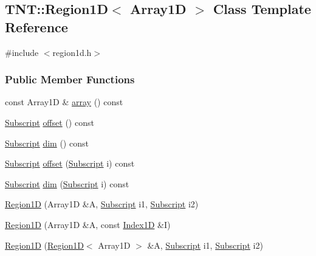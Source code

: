 \subsection{TNT::Region1D$<$ Array1D $>$ Class Template Reference}
\label{class_t_n_t_1_1_region1_d}


{\ttfamily \#include $<$region1d.h$>$}

\subsubsection*{Public Member Functions}
\begin{DoxyCompactItemize}
\item 
const Array1D \& \hyperlink{class_t_n_t_1_1_region1_d_a4a48f0b5e6afe11203954dfddfbfb043}{array} () const 
\item 
\hyperlink{namespace_t_n_t_af22e3f1460e145c04ce4e7d701e4c1c1}{Subscript} \hyperlink{class_t_n_t_1_1_region1_d_a4ed88c61c8a1896f2ce9f5c2bd526a80}{offset} () const 
\item 
\hyperlink{namespace_t_n_t_af22e3f1460e145c04ce4e7d701e4c1c1}{Subscript} \hyperlink{class_t_n_t_1_1_region1_d_ae6f7b2d153d4ea052350758477582fb4}{dim} () const 
\item 
\hyperlink{namespace_t_n_t_af22e3f1460e145c04ce4e7d701e4c1c1}{Subscript} \hyperlink{class_t_n_t_1_1_region1_d_aefc7cb51f8f4aea42c0c98bd4b52e626}{offset} (\hyperlink{namespace_t_n_t_af22e3f1460e145c04ce4e7d701e4c1c1}{Subscript} i) const 
\item 
\hyperlink{namespace_t_n_t_af22e3f1460e145c04ce4e7d701e4c1c1}{Subscript} \hyperlink{class_t_n_t_1_1_region1_d_a90770f8694db913e18cce320deb44133}{dim} (\hyperlink{namespace_t_n_t_af22e3f1460e145c04ce4e7d701e4c1c1}{Subscript} i) const 
\item 
\hyperlink{class_t_n_t_1_1_region1_d_aba435321e2decb4525752a3099ffd0f6}{Region1D} (Array1D \&A, \hyperlink{namespace_t_n_t_af22e3f1460e145c04ce4e7d701e4c1c1}{Subscript} i1, \hyperlink{namespace_t_n_t_af22e3f1460e145c04ce4e7d701e4c1c1}{Subscript} i2)
\item 
\hyperlink{class_t_n_t_1_1_region1_d_a912cdea70f01341659c674642d8893e2}{Region1D} (Array1D \&A, const \hyperlink{class_t_n_t_1_1_index1_d}{Index1D} \&I)
\item 
\hyperlink{class_t_n_t_1_1_region1_d_ac233b6dad14b1ab541ffd02d05e7a554}{Region1D} (\hyperlink{class_t_n_t_1_1_region1_d}{Region1D}$<$ Array1D $>$ \&A, \hyperlink{namespace_t_n_t_af22e3f1460e145c04ce4e7d701e4c1c1}{Subscript} i1, \hyperlink{namespace_t_n_t_af22e3f1460e145c04ce4e7d701e4c1c1}{Subscript} i2)

\end{DoxyCompactItemize}
